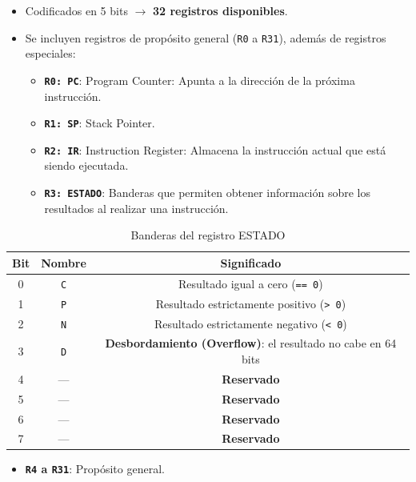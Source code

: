 \documentclass{article}
\begin{document}
\begin{itemize}
    \item Codificados en 5 bits $\rightarrow$ \textbf{32 registros disponibles}.
    \item Se incluyen registros de propósito general (\texttt{R0} a \texttt{R31}), además de registros especiales:
    \begin{itemize}
        \item \textbf{\texttt{R0: PC}}: Program Counter: Apunta a la dirección de la próxima instrucción.
        \item \textbf{\texttt{R1: SP}}: Stack Pointer.
        \item \textbf{\texttt{R2: IR}}: Instruction Register: Almacena la instrucción actual que está siendo ejecutada.
        \item \textbf{\texttt{R3: ESTADO}}: Banderas que permiten obtener información sobre los resultados al realizar una instrucción.
    \end{itemize}
\end{itemize}

\begin{table}[H]
    \centering
    \begin{tabular}{|c|c|c|}
    \hline
    \textbf{Bit} & \textbf{Nombre} & \textbf{Significado} \\
    \hline
    0 & \texttt{C} & Resultado igual a cero (\texttt{== 0}) \\
    1 & \texttt{P} & Resultado estrictamente positivo (\texttt{> 0}) \\
    2 & \texttt{N} & Resultado estrictamente negativo (\texttt{< 0}) \\
    3 & \texttt{D} & \textbf{Desbordamiento (Overflow)}: el resultado no cabe en 64 bits \\
    4 & — & \textbf{Reservado} \\
    5 & — & \textbf{Reservado} \\
    6 & — & \textbf{Reservado} \\
    7 & — & \textbf{Reservado} \\
    \hline
    \end{tabular}
    \caption{Banderas del registro ESTADO}
\end{table}

\begin{itemize}
    \item \textbf{\texttt{R4} a \texttt{R31}}: Propósito general.
\end{itemize}
\end{document}
